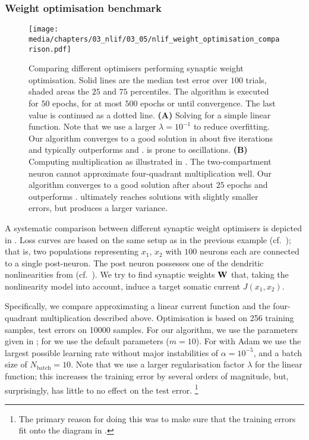 \pagebreak

\subsubsection{Weight optimisation benchmark}

\begin{figure}
	\centering
	\texttt{[image: media/chapters/03\_nlif/03\_05/nlif\_weight\_optimisation\_comparison.pdf]}%
	{\label{fig:nlif_weight_optimisation_comparison_a}}%
	{\label{fig:nlif_weight_optimisation_comparison_b}}%
	\caption[Comparing different optimisers performing synaptic weight optimisation]{Comparing different optimisers performing synaptic weight optimisation.
	Solid lines are the median test error over $100$ trials, shaded areas the $25$ and $75$ percentiles.
	The \SQP algorithm is executed for $50$ epochs, \LBFGSB for at most $500$ epochs or until convergence.
	The last value is continued as a dotted line.
	\textbf{(A)} Solving for a simple linear function. Note that we use a larger $\lambda = 10^{-1}$ to reduce overfitting. Our \SQP algorithm converges to a good solution in about five iterations and typically outperforms \LBFGSB and \SGD. \SGD is prone to oscillations.
	\textbf{(B)} Computing multiplication as illustrated in .
	The two-compartment neuron cannot approximate four-quadrant multiplication well.
	Our \SQP algorithm converges to a good solution after about $25$ epochs and outperforms \LBFGSB.
	\SGD ultimately reaches solutions with slightly smaller errors, but produces a larger variance.
	}
	\label{fig:nlif_weight_optimisation_comparison}
\end{figure}

A systematic comparison between different synaptic weight optimisers is depicted in .
Loss curves are based on the same setup as in the previous example (cf.~); that is, two populations representing $x_1$, $x_2$ with $100$ neurons each are connected to a single post-neuron.
The post neuron possesses one of the dendritic nonlinearities from  (cf.~).
We try to find synaptic weights $\mathbf{W}$ that, taking the nonlinearity model into account, induce a target somatic current $J(x_1, x_2)$.

Specifically, we compare approximating a linear current function and the four-quadrant multiplication described above.
Optimisation is based on \num{256} training samples, test errors on \num{10000} samples.
For our algorithm, we use the parameters given in ; for \LBFGSB we use the default parameters ($m = 10$).
For \SGD with Adam we use the largest possible learning rate without major instabilities of $\alpha = 10^{-5}$, and a batch size of $N_\mathrm{batch} = 10$.
Note that we use a larger regularisation factor $\lambda$ for the linear function; this increases the training error by several orders of magnitude, but, surprisingly, has little to no effect on the test error.%
\footnote{The primary reason for doing this was to make sure that the training errors fit onto the diagram in .}

